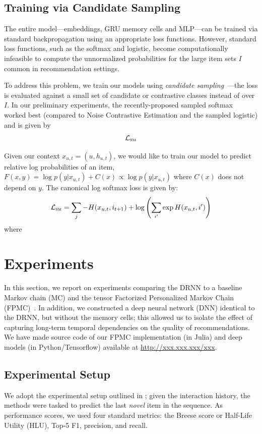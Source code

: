 \documentclass{sig-alternate-05-2015}
\begin{document}
\subsection{Training via Candidate Sampling}
The entire model---embeddings, GRU memory cells and MLP---can be trained via standard backpropagation using an appropriate loss functions. However, standard loss functions, such as the softmax and logistic, become computationally infeasible to compute the unnormalized probabilities for the large item sets $I$ common in recommendation settings.

To address this problem, we train our models using \emph{candidate sampling}~\cite{TFCandidateSampling}---the loss is evaluated against a small set of candidate or contrastive classes instead of over $I$. In our preliminary experiments, the recently-proposed sampled softmax~\cite{Jean2015} worked best (compared to Noise Contrastive Estimation and the sampled logistic) and is given by
\begin{align}
	\mathcal{L}_{\textsc{sm}}
\end{align}

Given our context $x_{u,t} = (u, h_{u,t})$, we would like to train our model to predict relative log probabilities of an item, $F(x,y) = \log p(y|x_{u,t}) + C(x) \propto \log p(y|x_{u,t})$ where $C(x)$ does not depend on $y$. The canonical log softmax loss is given by:
\begin{align}
	\mathcal{L}_{\textsc{sm}} = \sum_j -H(x_{u,t}, i_{t+1}) + \log \left( \sum_{i'} \exp H(x_{u,t}, i') \right)
\end{align}
where 


\section{Experiments}
In this section, we report on experiments comparing the DRNN to a baseline Markov chain (MC) and the tensor Factorized Personalized Markov Chain (FPMC)~\cite{Rendle2010}. In addition, we constructed a deep neural network (DNN) identical to the DRNN, but without the memory cells; this allowed us to isolate the effect of capturing long-term temporal dependencies on the quality of recommendations. We have made source code of our FPMC implementation (in Julia) and deep models (in Python/Tensorflow) available at \url{http://xxx.xxx.xxx/xxx}.

\subsection{Experimental Setup}
We adopt the experimental setup outlined in \cite{Rendle2010}; given the interaction history, the methods were tasked to predict the last \emph{novel} item in the sequence. As performance scores, we used four standard metrics: the Breese score or Half-Life Utility (HLU), Top-5 F1, precision, and recall.  
\end{document}
